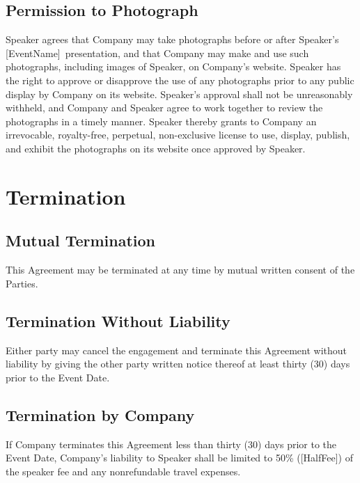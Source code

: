 \documentclass[a4paper,12pt]{article} %
\newcommand{\HalfFee}{[HalfFee]}
\newcommand{\EventName}{[EventName]}
\begin{document}
\subsection{Permission to Photograph}

Speaker agrees that Company may take photographs before or after Speaker's \EventName ~presentation, and that Company may make and use such photographs, including images of Speaker, on Company's website. Speaker has the right to approve or disapprove the use of any photographs prior to any public display by Company on its website. Speaker's approval shall not be unreasonably withheld, and Company and Speaker agree to work together to review the photographs in a timely manner. Speaker thereby grants to Company an irrevocable, royalty-free, perpetual, non-exclusive license to use, display, publish, and exhibit the photographs on its website once approved by Speaker.


\section{Termination}

\subsection{Mutual Termination}

This Agreement may be terminated at any time by mutual written consent of the Parties.

\subsection{Termination Without Liability}

Either party may cancel the engagement and terminate this Agreement without liability by giving the other party written notice thereof at least thirty (30) days prior to the Event Date.

\subsection{Termination by Company}

If Company terminates this Agreement less than thirty (30) days prior to the Event Date, Company's liability to Speaker shall be limited to 50\% (\HalfFee) of the speaker fee and any nonrefundable travel expenses.
\end{document}
